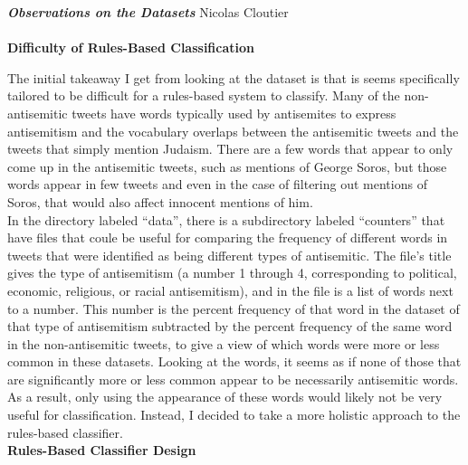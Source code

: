 \documentclass{article}
\begin{document}
{\bf \emph{Observations on the Datasets}} \hfill Nicolas Cloutier\\\\

{\bf Difficulty of Rules-Based Classification}

The initial takeaway I get from looking at the dataset is that is seems specifically tailored to be difficult for a rules-based system to classify. Many of the non-antisemitic tweets have words typically used by antisemites to express antisemitism and the vocabulary overlaps between the antisemitic tweets and the tweets that simply mention Judaism. There are a few words that appear to only come up in the antisemitic tweets, such as mentions of George Soros, but those words appear in few tweets and even in the case of filtering out mentions of Soros, that would also affect innocent mentions of him. \\

In the directory labeled ``data'', there is a subdirectory labeled ``counters'' that have files that coule be useful for comparing the frequency of different words in tweets that were identified as being different types of antisemitic. The file's title gives the type of antisemitism (a number 1 through 4, corresponding to political, economic, religious, or racial antisemitism), and in the file is a list of words next to a number. This number is the percent frequency of that word in the dataset of that type of antisemitism subtracted by the percent frequency of the same word in the non-antisemitic tweets, to give a view of which words were more or less common in these datasets. Looking at the words, it seems as if none of those that are significantly more or less common appear to be necessarily antisemitic words. As a result, only using the appearance of these words would likely not be very useful for classification. Instead, I decided to take a more holistic approach to the rules-based classifier. \\

{\bf Rules-Based Classifier Design}
\end{document}
